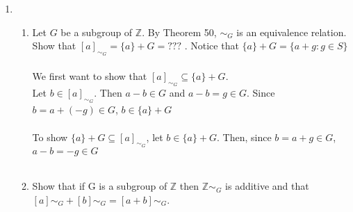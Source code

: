 \documentclass[11pt]{article}
\begin{document}
\begin{enumerate}
\newpage %
\item
\begin{enumerate}
\item Let $G$ be a subgroup of $\mathbb{Z}$. By Theorem 50, $\sim_G$ is an equivalence relation. Show that $[a]_{\sim_G} = \{a\}+G = ???$ . Notice that $\{a\} + G = \{a + g : g \in S\}$
\\
\\
We first want to show that $[a]_{\sim_G} \subseteq \{a\} + G$.\\
Let $b \in [a]_{\sim_G}$.  Then $a - b \in G$ and $a - b = g \in G$.  Since $b = a + (-g) \in G$, $b \in \{a\} + G$\\
\\
To show $\{a\} + G \subseteq [a]_{\sim_G}$, let $b \in \{a\} + G$.  Then, since $b = a + g \in G$, $a - b = -g \in G$
\\
\\

\item Show that if G is a subgroup of $\mathbb{Z}$ then $\mathbb{Z}\sim_G$ is additive and that $[a]\sim_G + [b]\sim_G = [a + b]\sim_G$.
\\
\\
\\
\\
\\
\\
\\

\end{enumerate}


\end{enumerate} %
\end{document}
